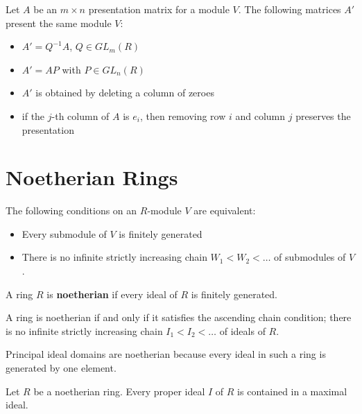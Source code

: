 \documentclass{memoir}
\begin{document}
\begin{prop}
	Let \(A\) be an \(m \times n\) presentation matrix for a module \(V\). The following matrices \(A' \) present the same module \(V\):
	\begin{itemize}
		\item \(A' = Q^{-1}A\), \(Q \in GL_m(R)\)
		\item \(A' = AP\) with \(P \in GL_n(R)\)
		\item \(A'\) is obtained by deleting a column of zeroes
		\item if the \(j\)-th column of \(A\) is \(e_i\), then removing row \(i\) and column \(j\) preserves the presentation
	\end{itemize}
\end{prop}

\section{Noetherian Rings}
\label{sec:noetherian_rings}

\begin{prop}
	The following conditions on an \(R\)-module \(V\) are equivalent:
	\begin{itemize}
		\item Every submodule of \(V\) is finitely generated
		\item There is no infinite strictly increasing chain \(W_1 < W_2 < \ldots\) of submodules of \(V\).
	\end{itemize}
\end{prop}

\begin{defn}[Noetherian]
	A ring \(R\) is \textbf{noetherian} if every ideal of \(R\) is finitely generated.
\end{defn}
\begin{cor}
	A ring is noetherian if and only if it satisfies the ascending chain condition; there is no infinite strictly increasing chain \(I_1<I_2<\ldots\) of ideals of \(R\).
\end{cor}
Principal ideal domains are noetherian because every ideal in such a ring is generated by one element.

\begin{cor}
	Let \(R\) be a noetherian ring. Every proper ideal \(I\) of \(R\) is contained in a maximal ideal.
\end{cor}
\end{document}
